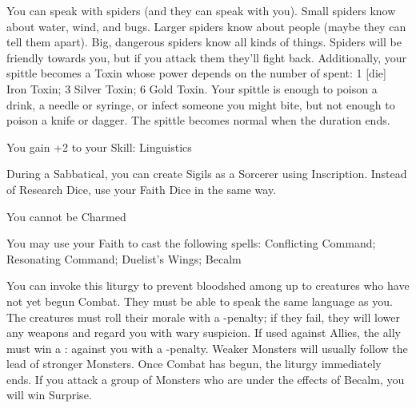 {\LITURGY [
  Name= Spidertongue,
  Link=iktomi-liturgy-spidertongue,
  Paradigm= Biomancy ,
  Save=  Y (negates) ,
  Duration= Combat or \SUMDICE Minutes ,
  Counter=  n/a  ,
  Keywords= None ,
  Target=   Self
]



You can speak with spiders (and they can speak with you).  Small spiders know about water, wind, and bugs.  Larger spiders know about people (maybe they can tell them apart).  Big, dangerous spiders know all kinds of things.  Spiders will be friendly towards you, but if you attack them they'll fight back.  Additionally, your spittle becomes a Toxin whose power depends on the number of \DICE spent: 1 [die] Iron Toxin; 3 \DICE Silver Toxin; 6 \DICE Gold Toxin.  Your spittle is enough to poison a drink, a needle or syringe, or infect someone you might bite, but not enough to poison a knife or dagger.  The spittle becomes normal when the duration ends.





\GOD[
Name=Mímir,
Link=small-god-mímir,
GodOf=God of Runes,
Holy=a necklace of runes scribed on tiles
]


You gain +2 to your Skill: Linguistics


During a Sabbatical, you can create Sigils as a Sorcerer using Inscription.  Instead of Research Dice, use your Faith Dice in the same way.  




\GOD[
Name=The Grey Lords,
Link=small-god-the grey lords,
GodOf=Archons of Diplomacy,
Holy=a choker of dove feathers
]


You cannot be Charmed


You may use your Faith to cast the following spells: Conflicting Command; Resonating Command; Duelist's Wings; Becalm

\LITURGY [
  Name= Becalm,
  Link= grey-lords-liturgy-becalm,
  Paradigm= Mind ,
  Save=  N ,
  Duration= Markovian ,
  Counter=  n/a  ,
  Keywords= Splittable ,
  Target=   Close or Nearby Monsters
]



You can invoke this liturgy to prevent bloodshed among up to \DICE creatures who have not yet begun Combat.  They must be able to speak the same language as you.  The creatures must roll their morale with a -\DICE penalty; if they fail, they will lower any weapons and regard you with wary suspicion.  If used against Allies, the ally must win a \RB : \FOC against you with a -\DICE penalty.  Weaker Monsters will usually follow the lead of stronger Monsters.  Once Combat has begun, the liturgy immediately ends.  If you attack a group of Monsters who are under the effects of Becalm, you will win Surprise.

}
